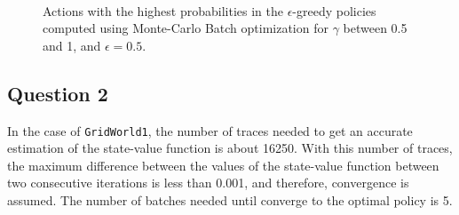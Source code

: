 \documentclass[11pt]{article}   	%
\begin{document}
\begin{figure}[ht!]
     \begin{center}
%
        \\ %
    \end{center}
    \caption{%
        Actions with the highest probabilities in the $\epsilon$-greedy policies computed using Monte-Carlo Batch optimization for $\gamma$ between 0.5 and 1, and $\epsilon=0.5$. 
     }%
   \label{fig:gammacomp}
\end{figure}


\subsection*{Question 2}

In the case of \texttt{GridWorld1}, the number of traces needed to get an accurate estimation of the state-value function is about 16250. With this number of traces, the maximum difference between the values of the state-value function between two consecutive iterations is less than 0.001, and therefore, convergence is assumed. The number of batches needed until converge to the optimal policy is 5.
\end{document}
